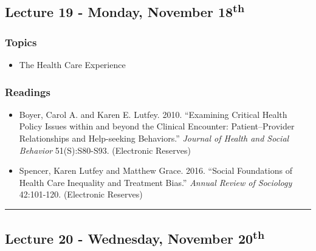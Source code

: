 \documentclass[]{book}
\providecommand{\tightlist}{%
  \setlength{\itemsep}{0pt}\setlength{\parskip}{0pt}}
\begin{document}
\hypertarget{lecture-19---monday-november-18th}{%
\subsection*{\texorpdfstring{Lecture 19 - Monday, November 18\textsuperscript{th}}{Lecture 19 - Monday, November 18th}}\label{lecture-19---monday-november-18th}}

\hypertarget{topics-24}{%
\subsubsection*{Topics}\label{topics-24}}

\begin{itemize}
\tightlist
\item
  The Health Care Experience
\end{itemize}

\hypertarget{readings-22}{%
\subsubsection*{Readings}\label{readings-22}}

\begin{itemize}
\tightlist
\item
  Boyer, Carol A. and Karen E. Lutfey. 2010. ``Examining Critical Health Policy Issues within and beyond the Clinical Encounter: Patient--Provider Relationships and Help-seeking Behaviors.'' \emph{Journal of Health and Social Behavior} 51(S):S80-S93. (Electronic Reserves)
\item
  Spencer, Karen Lutfey and Matthew Grace. 2016. ``Social Foundations of Health Care Inequality and Treatment Bias.'' \emph{Annual Review of Sociology} 42:101-120. (Electronic Reserves)
\end{itemize}

\begin{center}\rule{0.5\linewidth}{\linethickness}\end{center}

\hypertarget{lecture-20---wednesday-november-20th}{%
\subsection*{\texorpdfstring{Lecture 20 - Wednesday, November 20\textsuperscript{th}}{Lecture 20 - Wednesday, November 20th}}\label{lecture-20---wednesday-november-20th}}
\end{document}
